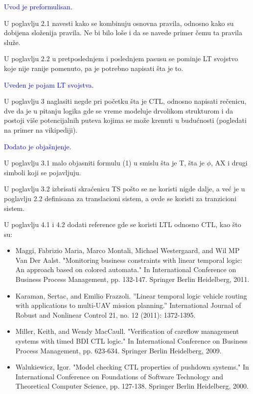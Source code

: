 \documentclass[a4paper]{report}
\newcommand{\odgovor}[1]{\textcolor{blue}{#1}}
\begin{document}
\odgovor{Uvod je preformulisan.}

U poglavlju 2.1 navesti kako se kombinuju osnovna pravila, odnosno kako su dobijena složenija pravila. Ne bi bilo loše i da se navede primer čemu ta pravila služe.

U poglavlju 2.2 u pretposlednjem i poslednjem pasusu se pominje LT svojstvo koje nije ranije pomenuto, pa je potrebno napisati šta je to. 

\odgovor{Uveden je pojam LT svojstva.}

U poglavlju 3 naglasiti negde pri početku šta je CTL, odnosno napisati rečenicu, dve da je u pitanju logika gde se vreme modeluje drvolikom strukturom i da postoji više potencijalnih puteva kojima se može krenuti u budućnosti (pogledati na primer na vikipediji). 

\odgovor{Dodato je objašnjenje.}

U poglavlju 3.1 malo objasniti formulu (1) u smislu šta je T, šta je $\phi$, AX i drugi simboli koji se pojavljuju.

U poglavlju 3.2 izbrisati skraćenicu TS pošto se ne koristi nigde dalje, a već je u poglavlju 2.2 definisana za translacioni sistem, a ovde se koristi za tranzicioni sistem.

U poglavlju 4.1 i 4.2 dodati reference gde se koristi LTL odnosno CTL, kao što su:

\begin{itemize}
	\item Maggi, Fabrizio Maria, Marco Montali, Michael Westergaard, and Wil MP Van Der Aalst. "Monitoring business constraints with linear temporal logic: An approach based on colored automata." In International Conference on Business Process Management, pp. 132-147. Springer Berlin Heidelberg, 2011.
	
	\item Karaman, Sertac, and Emilio Frazzoli. ''Linear temporal logic vehicle routing with applications to multi-UAV mission planning.'' International Journal of Robust and Nonlinear Control 21, no. 12 (2011): 1372-1395.
		
	\item Miller, Keith, and Wendy MacCaull. "Verification of careflow management systems with timed BDI CTL logic." In International Conference on Business Process Management, pp. 623-634. Springer Berlin Heidelberg, 2009.
	
	\item Walukiewicz, Igor. "Model checking CTL properties of pushdown systems." In International Conference on Foundations of Software Technology and Theoretical Computer Science, pp. 127-138. Springer Berlin Heidelberg, 2000.
\end{itemize}
\end{document}
